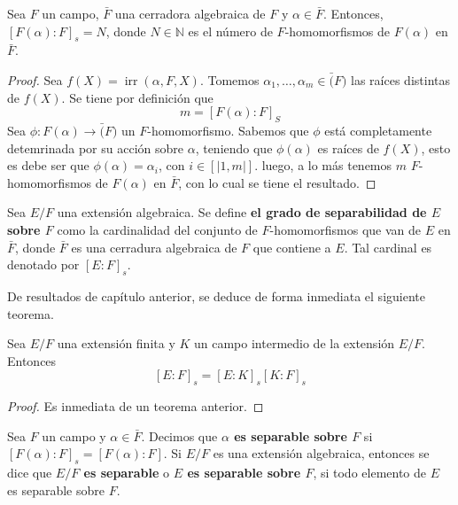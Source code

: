 \documentclass[12pt]{report}
\theoremstyle{largebreak}
\newcommand\cf[3]{\ensuremath{#1:#2\rightarrow#3}}
\newcommand\natint[1]{\ensuremath{\left[\big|#1\big|\right]}}
\DeclareMathOperator{\irr}{irr}
\begin{document}
    \begin{propo}
        Sea $F$ un campo, $\bar{F}$ una cerradora algebraica de $F$ y $\alpha\in\bar{F}$. Entonces, $\left[F(\alpha):F\right]_s=N$, donde $N\in\mathbb{N}$ es el número de $F$-homomorfismos de $F(\alpha)$ en $\bar{F}$.
    \end{propo}
    
    \begin{proof}
        Sea $f(X)=\irr(\alpha,F, X)$. Tomemos $\alpha_1,\dots,\alpha_m\in \bar(F)$ las raíces distintas de $f(X)$. Se tiene por definición que
        \begin{equation*}
            m=\left[F(\alpha):F\right]_{S}
        \end{equation*}
        Sea $\cf{\phi}{F(\alpha)}{\bar(F)}$ un $F$-homomorfismo. Sabemos que $\phi$ está completamente detemrinada por su acción sobre $\alpha$, teniendo que $\phi(\alpha)$ es raíces de $f(X)$, esto es debe ser que $\phi(\alpha)=\alpha_{i}$, con $i\in\natint{1,m}$. luego, a lo más tenemos $m$ $F$-homomorfismos de $F(\alpha)$ en $\bar{F}$, con lo cual se tiene el resultado.
    \end{proof}

    \begin{mydef}
        Sea $E/F$ una extensión algebraica. Se define \textbf{el grado de separabilidad de $E$ sobre $F$} como la cardinalidad del conjunto de $F$-homomorfismos que van de $E$ en $\bar{F}$, donde $\bar{F}$ es una cerradura algebraica de $F$ que contiene a $E$. Tal cardinal es denotado por $\left[E:F\right]_s$.
    \end{mydef}

    De resultados de capítulo anterior, se deduce de forma inmediata el siguiente teorema.

    \begin{theor}
        Sea $E/F$ una extensión finita y $K$ un campo intermedio de la extensión $E/F$. Entonces
        \begin{equation}
            \left[E:F\right]_s=\left[E:K\right]_s \left[K:F\right]_s
        \end{equation}
    \end{theor}

    \begin{proof}
        Es inmediata de un teorema anterior.
    \end{proof}

    \begin{mydef}
        Sea $F$ un campo y $\alpha\in\bar{F}$. Decimos que \textbf{$\alpha$ es separable sobre $F$} si $\left[F(\alpha):F\right]_s=\left[F(\alpha):F\right]$. Si $E/F$ es una extensión algebraica, entonces se dice que \textbf{$E/F$ es separable} o \textbf{$E$ es separable sobre $F$}, si todo elemento de $E$ es separable sobre $F$.
    \end{mydef}
\end{document}
